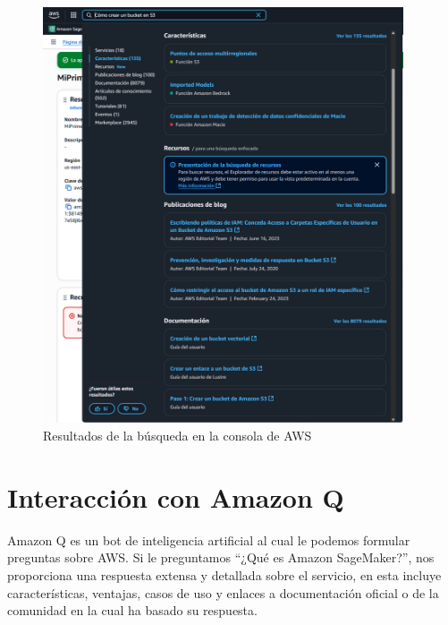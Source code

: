 \documentclass{article}
\begin{document}
	\begin{figure}[h!]
	\centering
	\includegraphics[width=0.95\textwidth]{tarea_5.png}
	\caption{Resultados de la búsqueda en la consola de AWS}
	\end{figure}

	\newpage

	\section{Interacción con Amazon Q}

	Amazon Q es un bot de inteligencia artificial al cual le podemos formular preguntas sobre AWS. Si le preguntamos ``¿Qué es Amazon SageMaker?'', nos proporciona una respuesta extensa y detallada sobre el servicio, en esta incluye características, ventajas, casos de uso y enlaces a documentación oficial o de la comunidad en la cual ha basado su respuesta.
\end{document}
